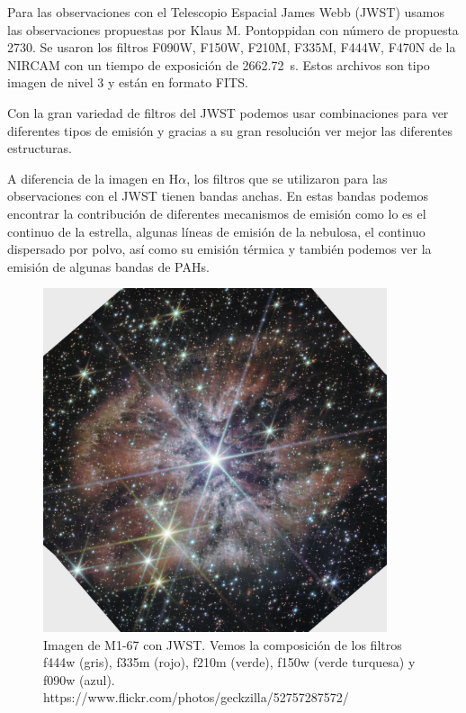 \documentclass{book}
\begin{document}
Para las observaciones con el Telescopio Espacial James Webb (JWST) usamos las observaciones propuestas por Klaus M. Pontoppidan con número de propuesta 2730. Se usaron los filtros F090W, F150W, F210M, F335M, F444W, F470N de la NIRCAM con un tiempo de exposición de \SI{2662.72}{s}. Estos archivos son tipo imagen de nivel 3 y están en formato FITS.

Con la gran variedad de filtros del JWST podemos usar combinaciones para ver diferentes tipos de emisión y gracias a su gran resolución ver mejor las diferentes estructuras.

A diferencia de la imagen en H$\alpha$, los filtros que se utilizaron para las observaciones con el JWST tienen bandas anchas. En estas bandas podemos encontrar la contribución de diferentes mecanismos de emisión como lo es el continuo de la estrella, algunas líneas de emisión de la nebulosa, el continuo dispersado por polvo, así como su emisión térmica y también podemos ver la emisión de algunas bandas de PAHs.

\begin{figure}[htb]
    \centering
    \includegraphics[width=0.9\textwidth]{M1-67-JWST.jpg}
    \caption{Imagen de M1-67 con JWST. Vemos la composición de los filtros f444w (gris), f335m (rojo), f210m (verde), f150w (verde turquesa) y f090w (azul). https://www.flickr.com/photos/geckzilla/52757287572/}
    \label{fig:M1-67JWST}
\end{figure}
\end{document}
